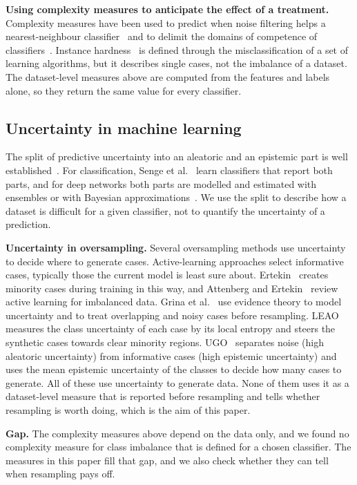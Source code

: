 \documentclass[preprint,12pt]{elsarticle}
\begin{document}
\textbf{Using complexity measures to anticipate the effect of a treatment.} Complexity measures have been used to predict when noise filtering helps a nearest-neighbour classifier~\cite{Saez2013} and to delimit the domains of competence of classifiers~\cite{Luengo2015}. Instance hardness~\cite{Smith2014} is defined through the misclassification of a set of learning algorithms, but it describes single cases, not the imbalance of a dataset. The dataset-level measures above are computed from the features and labels alone, so they return the same value for every classifier.

\subsection{Uncertainty in machine learning}
The split of predictive uncertainty into an aleatoric and an epistemic part is well established~\cite{DerKiureghian2009,Hullermeier2021}. For classification, Senge et al.~\cite{Senge2014} learn classifiers that report both parts, and for deep networks both parts are modelled and estimated with ensembles or with Bayesian approximations~\cite{Kendall2017,Lakshminarayanan2017}. We use the split to describe how a dataset is difficult for a given classifier, not to quantify the uncertainty of a prediction.

\textbf{Uncertainty in oversampling.} Several oversampling methods use uncertainty to decide where to generate cases. Active-learning approaches select informative cases, typically those the current model is least sure about. Ertekin~\cite{Ertekin2013} creates minority cases during training in this way, and Attenberg and Ertekin~\cite{Attenberg2013} review active learning for imbalanced data. Grina et al.~\cite{Grina2021} use evidence theory to model uncertainty and to treat overlapping and noisy cases before resampling. LEAO~\cite{Tao2026} measures the class uncertainty of each case by its local entropy and steers the synthetic cases towards clear minority regions. UGO~\cite{Saglam2026} separates noise (high aleatoric uncertainty) from informative cases (high epistemic uncertainty) and uses the mean epistemic uncertainty of the classes to decide how many cases to generate. All of these use uncertainty to generate data. None of them uses it as a dataset-level measure that is reported before resampling and tells whether resampling is worth doing, which is the aim of this paper.

\textbf{Gap.} The complexity measures above depend on the data only, and we found no complexity measure for class imbalance that is defined for a chosen classifier. The measures in this paper fill that gap, and we also check whether they can tell when resampling pays off.
\end{document}
